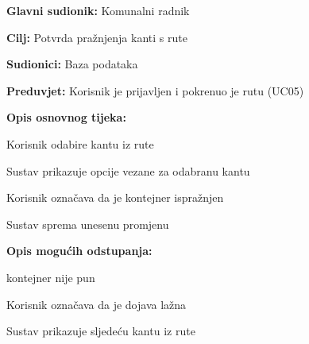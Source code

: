 	\noindent {}
					\begin{packed_item}
	
						\item \textbf{Glavni sudionik: }Komunalni radnik
						\item  \textbf{Cilj:} Potvrda pražnjenja kanti s rute
						\item  \textbf{Sudionici:} Baza podataka
						\item  \textbf{Preduvjet:} Korisnik je prijavljen i pokrenuo je rutu (UC05)
						\item  \textbf{Opis osnovnog tijeka:}
						
						\item[] \begin{packed_enum}
	
							\item Korisnik odabire kantu iz rute
							\item Sustav prikazuje opcije vezane za odabranu kantu
							\item Korisnik označava da je kontejner ispražnjen
							\item Sustav sprema unesenu promjenu
							
						\end{packed_enum}
						
						\item  \textbf{Opis mogućih odstupanja:}
						
						\item[] \begin{packed_item}
	
							\item[3.a] kontejner nije pun
							
							\item[] \begin{packed_enum}
								
								\item Korisnik označava da je dojava lažna
								\item Sustav prikazuje sljedeću kantu iz rute
								
							\end{packed_enum}
						\end{packed_item}
					\end{packed_item}

